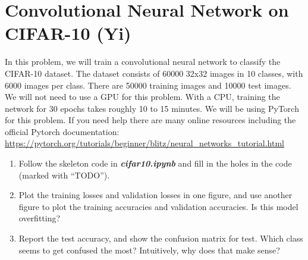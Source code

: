 \documentclass{exam}
\begin{document}
\section{Convolutional Neural Network on CIFAR-10 (Yi)}
In this problem, we will train a convolutional neural network to classify the CIFAR-10 dataset. The dataset consists of 60000 32x32 images in 10 classes, with 6000 images per class. There are 50000 training images and 10000 test images. We will not need to use a GPU for this problem. With a CPU, training the network for 30 epochs takes roughly 10 to 15 minutes. We will be using PyTorch for this problem. If you need help there are many online resources including the official Pytorch documentation: \url{https://pytorch.org/tutorials/beginner/blitz/neural\_networks\_tutorial.html}
\begin{enumerate}
    \item Follow the skeleton code in \textbf{\textit{cifar10.ipynb}} and fill in the holes in the code (marked with ``TODO”).
    \item Plot the training losses and validation losses in one figure, and use another figure to plot the training accuracies and validation accuracies. Is this model overfitting?
    \item Report the test accuracy, and show the confusion matrix for test. Which class seems to get confused the most? Intuitively, why does that make sense?
\end{enumerate}
\end{document}
